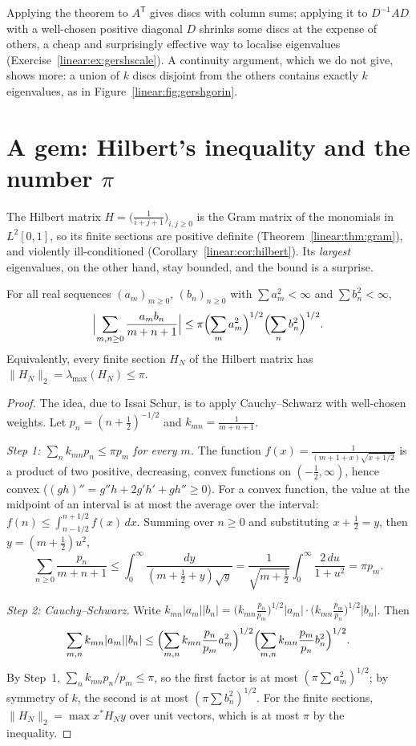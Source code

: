 Applying the theorem to $A^{\mathsf T}$ gives discs with column sums; applying it to $D^{-1}AD$ with a well-chosen positive diagonal $D$
shrinks some discs at the expense of others, a cheap and surprisingly effective way to localise eigenvalues (Exercise~\ref{linear:ex:gershscale}).
A continuity argument, which we do not give, shows more: a union of $k$ discs disjoint from the others contains exactly $k$ eigenvalues,
as in Figure~\ref{linear:fig:gershgorin}.

\section{A gem: Hilbert's inequality and the number $\pi$}

The Hilbert matrix $H=\bigl(\frac1{i+j+1}\bigr)_{i,j\ge0}$ is the Gram matrix of the monomials in $L^2[0,1]$, so its finite sections are
positive definite (Theorem~\ref{linear:thm:gram}), and violently ill-conditioned (Corollary~\ref{linear:cor:hilbert}). Its \emph{largest}
eigenvalues, on the other hand, stay bounded, and the bound is a surprise.

\begin{theorem}\label{linear:thm:hilbertineq}
For all real sequences $(a_m)_{m\ge0}$, $(b_n)_{n\ge0}$ with $\sum a_m^2<\infty$ and $\sum b_n^2<\infty$,
\[
\Bigl|\sum_{m,n\ge0}\frac{a_mb_n}{m+n+1}\Bigr|\le\pi\Bigl(\sum_ma_m^2\Bigr)^{1/2}\Bigl(\sum_nb_n^2\Bigr)^{1/2}.
\]
Equivalently, every finite section $H_N$ of the Hilbert matrix has $\|H_N\|_2=\lambda_{\max}(H_N)\le\pi$.
\end{theorem}
\begin{proof}
The idea, due to Issai Schur, is to apply Cauchy--Schwarz with well-chosen weights. Let $p_n=(n+\frac12)^{-1/2}$ and $k_{mn}=\frac1{m+n+1}$.

\emph{Step 1: $\sum_nk_{mn}p_n\le\pi p_m$ for every $m$.} The function $f(x)=\frac1{(m+1+x)\sqrt{x+1/2}}$ is a product of two positive,
decreasing, convex functions on $(-\frac12,\infty)$, hence convex ($(gh)''=g''h+2g'h'+gh''\ge0$). For a convex function, the value at the
midpoint of an interval is at most the average over the interval: $f(n)\le\int_{n-1/2}^{n+1/2}f(x)\,dx$. Summing over $n\ge0$ and
substituting $x+\frac12=y$, then $y=(m+\frac12)u^2$,
\[
\sum_{n\ge0}\frac{p_n}{m+n+1}\le\int_0^\infty\frac{dy}{(m+\frac12+y)\sqrt y}=\frac1{\sqrt{m+\frac12}}\int_0^\infty\frac{2\,du}{1+u^2}=
\pi p_m.
\]

\emph{Step 2: Cauchy--Schwarz.} Write $k_{mn}|a_m||b_n|=\bigl(k_{mn}\frac{p_n}{p_m}\bigr)^{1/2}|a_m|\cdot\bigl(k_{mn}\frac{p_m}{p_n}\bigr)^{1/2}
|b_n|$. Then
\[
\sum_{m,n}k_{mn}|a_m||b_n|\le\Bigl(\sum_{m,n}k_{mn}\frac{p_n}{p_m}a_m^2\Bigr)^{1/2}\Bigl(\sum_{m,n}k_{mn}\frac{p_m}{p_n}b_n^2\Bigr)^{1/2}.
\]
By Step~1, $\sum_nk_{mn}p_n/p_m\le\pi$, so the first factor is at most $(\pi\sum a_m^2)^{1/2}$; by symmetry of $k$, the second is at most
$(\pi\sum b_n^2)^{1/2}$. For the finite sections, $\|H_N\|_2=\max x^*H_Ny$ over unit vectors, which is at most $\pi$ by the inequality.
\end{proof}

